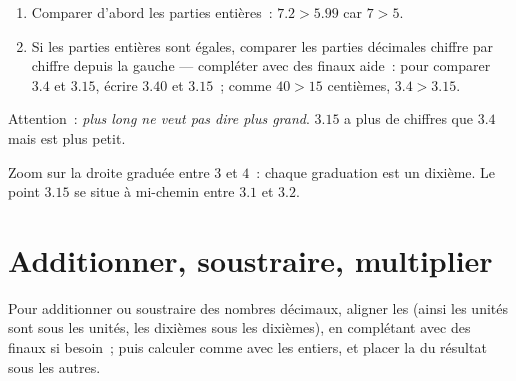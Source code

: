 \begin{method}\label{met:g6:decimals:compare}
\begin{enumerate}
  \item Comparer d'abord les parties entières~: $7.2 > 5.99$ car
        $7 > 5$.
  \item Si les parties entières sont égales, comparer les parties
        décimales chiffre par chiffre depuis la gauche --- compléter
        avec des  finaux aide~: pour comparer $3.4$ et $3.15$,
        écrire $3.40$ et $3.15$~; comme $40 > 15$ centièmes,
        $3.4 > 3.15$.
\end{enumerate}
Attention~: \emph{plus long ne veut pas dire plus grand}. $3.15$ a
plus de chiffres que $3.4$ mais est plus petit.
\end{method}

\begin{omfigure}

{\small Zoom sur la droite graduée entre $3$ et $4$~: chaque
graduation est un dixième. Le point $3.15$ se situe à mi-chemin
entre $3.1$ et $3.2$.}
\end{omfigure}

\section{Additionner, soustraire, multiplier}

\begin{method}\label{met:g6:decimals:columns}
Pour additionner ou soustraire des nombres décimaux, aligner les
\emph{} (ainsi les unités sont sous les unités, les dixièmes
sous les dixièmes), en complétant avec des  finaux si besoin~;
puis calculer comme avec les entiers, et placer la  du
résultat sous les autres.
\end{method}

